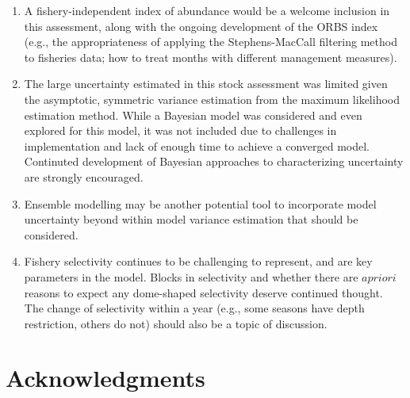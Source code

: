 \documentclass[11pt,
  english,
  a4paper,
]{article}
\begin{document}
\begin{enumerate}
  \tagmcend\tagstructend\tagstructend
\item

  A fishery-independent index of abundance would be a welcome inclusion in this assessment, along with the ongoing development of the ORBS index (e.g., the appropriateness of applying the Stephens-MacCall filtering method to fisheries data; how to treat months with different management measures).

  \tagmcend\tagstructend\tagstructend
\item

  The large uncertainty estimated in this stock assessment was limited given the asymptotic, symmetric variance estimation from the maximum likelihood estimation method. While a Bayesian model was considered and even explored for this model, it was not included due to challenges in implementation and lack of enough time to achieve a converged model. Continuted development of Bayesian approaches to characterizing uncertainty are strongly encouraged.

  \tagmcend\tagstructend\tagstructend
\item

  Ensemble modelling may be another potential tool to incorporate model uncertainty beyond within model variance estimation that should be considered.

  \tagmcend\tagstructend\tagstructend
\item

  Fishery selectivity continues to be challenging to represent, and are key parameters in the model. Blocks in selectivity and whether there are {\(a priori\)\leavevmode\tagmcend\tagstructend} reasons to expect any dome-shaped selectivity deserve continued thought. The change of selectivity within a year (e.g., some seasons have depth restriction, others do not) should also be a topic of discussion.

  \tagmcend\tagstructend\tagstructend
\end{enumerate}

\tagstructend


\hypertarget{acknowledgments}{%
\section{Acknowledgments}\label{acknowledgments}}
\end{document}
